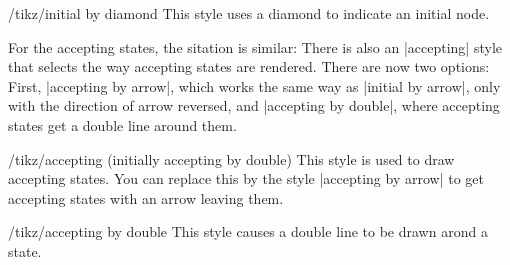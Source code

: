 \begin{stylekey}{/tikz/initial by diamond}
  This style uses a diamond to indicate an initial node. 
\end{stylekey}

For the accepting states, the sitation is similar: There is also an
|accepting| style that selects the way accepting states are
rendered. There are now two options: First,
|accepting by arrow|, which works the same way as |initial by arrow|,
only with the direction of arrow reversed, and |accepting by double|,
where accepting states get a double line around them.

\begin{stylekey}{/tikz/accepting (initially accepting by double)}
  This style is used to draw accepting states.  You can replace
  this by the style |accepting by arrow| to get accepting states with
  an arrow leaving them.
\end{stylekey}

\begin{stylekey}{/tikz/accepting by double}
  This style causes a double line to be drawn arond a state.
\end{stylekey}

